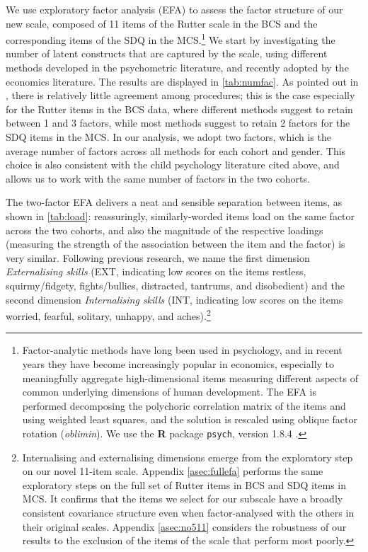 We use exploratory factor analysis (EFA) to assess the factor structure of our new scale, composed of 11 items of the Rutter scale in the BCS and the corresponding items of the SDQ in the MCS.\footnote{Factor-analytic methods have long been used in psychology, and in recent years they have become increasingly popular in economics, especially to meaningfully aggregate high-dimensional items measuring different aspects of common underlying dimensions of human development. The EFA is performed decomposing the polychoric correlation matrix of the items and using weighted least squares, and the solution is rescaled using oblique factor rotation (\emph{oblimin}). We use the \textbf{\textsf{R}} package \texttt{psych}, version 1.8.4 \citep{Revelle2018}.} We start by investigating the number of latent constructs that are captured by the scale, using different methods developed in the psychometric literature, and recently adopted by the economics literature. The results are displayed in \autoref{tab:numfac}. As pointed out in \citet{Conti2014}, there is relatively little agreement among procedures; this is the case especially for the Rutter items in the BCS data, where different methods suggest to retain between 1 and 3 factors, while most methods suggest to retain 2 factors for the SDQ items in the MCS. In our analysis, we adopt two factors, which is the average number of factors across all methods for each cohort and gender. This choice is also consistent with the child psychology literature cited above, and allows us to work with the same number of factors in the two cohorts. 

The two-factor EFA delivers a neat and sensible separation between items, as shown in \autoref{tab:load}: reassuringly, similarly-worded items load on the same factor across the two cohorts, and also the magnitude of the respective loadings (measuring the strength of the association between the item and the factor) is very similar. Following previous research, we name the first dimension \emph{Externalising skills} (EXT, indicating low scores on the items restless, squirmy/fidgety, fights/bullies, distracted, tantrums, and disobedient) and the second dimension \emph{Internalising skills} (INT, indicating low scores on the items worried, fearful, solitary, unhappy, and aches).\footnote{Internalising and externalising dimensions emerge from the exploratory step on our novel 11-item scale. Appendix \autoref{asec:fullefa} performs the same exploratory steps on the full set of Rutter items in BCS and SDQ items in MCS. It confirms that the items we select for our subscale have a broadly consistent covariance structure even when factor-analysed with the others in their original scales. Appendix \autoref{asec:no511} considers the robustness of our results to the exclusion of the items of the scale that perform most poorly.}

